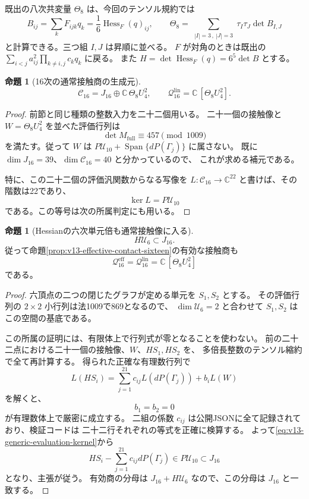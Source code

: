 \documentclass[a4paper,11pt]{ltjsarticle}
\theoremstyle{definition}
\newtheorem{proposition}[theorem]{命題}
\newcommand{\CC}{\mathbb C}
\begin{document}
既出の八次共変量 $\Theta_8$ は、今回のテンソル規約では
\begin{equation}\label{eq:v13-theta-general-tensor}
 B_{ij}=\sum_kF_{ijk}q_k=\frac16\operatorname{Hess}_F(q)_{ij},
 \qquad
 \Theta_8=\sum_{\substack{|I|=3\,,\ |J|=3}}
          \tau_I\tau_J\det B_{I,J}
\end{equation}
と計算できる。三つ組 $I,J$ は昇順に並べる。
$F$ が対角のときは既出の
$\sum_{i<j}a_{ij}^2\prod_{k\ne i,j}c_kq_k$ に戻る。
また $H=\det\operatorname{Hess}_F(q)=6^5\det B$ とする。

\begin{proposition}[16次の通常接触商の生成元]
\label{prop:v13-sixteenth-complement}
\[
 \mathcal C_{16}=J_{16}\oplus\CC\,\Theta_8U_4^2,
 \qquad
 \mathcal Q^{\mathrm{lin}}_{16}=\CC\,[\Theta_8U_4^2].
\]
\end{proposition}
\begin{proof}
前節と同じ種類の整数入力を二十二個用いる。
二十一個の接触像と $W=\Theta_8U_4^2$ を並べた評価行列は
\[
 \det M_{\mathrm{full}}\equiv457\pmod{1009}
\]
を満たす。従って $W$ は
$P\mathcal U_{10}+\operatorname{Span}\{dP(\Gamma_j)\}$ に属さない。
既に $\dim J_{16}=39$、$\dim\mathcal C_{16}=40$ と分かっているので、
これが求める補元である。

特に、この二十二個の評価汎関数からなる写像を
$L:\mathcal C_{16}\to\CC^{22}$ と書けば、その階数は22であり、
\begin{equation}\label{eq:v13-generic-evaluation-kernel}
 \ker L=P\mathcal U_{10}
\end{equation}
である。この等号は次の所属判定にも用いる。
\end{proof}

\begin{proposition}[Hessianの六次単元倍も通常接触像に入る]
\label{prop:v13-hessian-unit-membership}
\[
 H\mathcal U_6\subset J_{16}.
\]
従って命題\ref{prop:v13-effective-contact-sixteen}の有効な接触商も
\[
 \mathcal Q^{\mathrm{eff}}_{16}
 =\mathcal Q^{\mathrm{lin}}_{16}
 =\CC\,[\Theta_8U_4^2]
\]
である。
\end{proposition}
\begin{proof}
六頂点の二つの閉じたグラフが定める単元を $S_1,S_2$ とする。
その評価行列の $2\times2$ 小行列は法1009で869となるので、
$\dim\mathcal U_6=2$ と合わせて $S_1,S_2$ はこの空間の基底である。

この所属の証明には、有限体上で行列式が零となることを使わない。
前の二十二点における二十一個の接触像、$W$、$HS_1,HS_2$ を、
多倍長整数のテンソル縮約で全て再計算する。
得られた正確な有理数行列で
\[
 L(HS_i)=\sum_{j=1}^{21}c_{ij}L(dP(\Gamma_j))+b_iL(W)
\]
を解くと、
\[
 b_1=b_2=0
\]
が有理数体上で厳密に成立する。
二組の係数 $c_{ij}$ は公開JSONに全て記録されており、検証コードは
二十二行それぞれの等式を正確に検算する。
よって\eqref{eq:v13-generic-evaluation-kernel}から
\[
 HS_i-\sum_{j=1}^{21}c_{ij}dP(\Gamma_j)\in P\mathcal U_{10}\subset J_{16}
\]
となり、主張が従う。
有効商の分母は $J_{16}+H\mathcal U_6$ なので、この分母は $J_{16}$ と一致する。
\end{proof}
\end{document}
